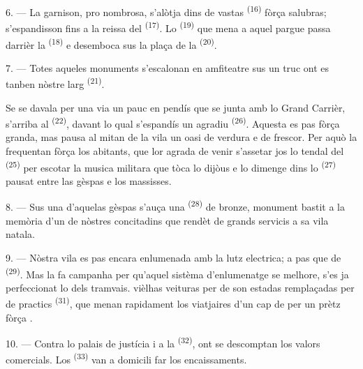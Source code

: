 \VUsaut{5.0mm}
\VUsaut{3.4mm}

6. --- La garnison, pro nombrosa, s'alòtja dins de vastas 
\textsuperscript{(16)} fòrça salubras; s'espandisson fins a la reissa del
 \textsuperscript{(17)}. Lo 
\textsuperscript{(19)} que mena a aquel pargue passa darrièr la  \textsuperscript{(18)} e desemboca sus la plaça de la
 \textsuperscript{(20)}.

7. --- Totes aqueles monuments s'escalonan en amfiteatre sus un truc ont es tanben
nòstre larg  \textsuperscript{(21)}.

Se se davala per una via un pauc en pendís que se junta amb lo Grand Carrièr,
s'arriba al  \textsuperscript{(22)}, davant lo qual
s'espandís un agradiu  \textsuperscript{(26)}. Aquesta
 es pas fòrça granda, mas pausa al mitan de la vila un
oasi de verdura e de frescor. Per aquò la frequentan fòrça los abitants, que lor
agrada de venir s'assetar jos lo tendal del  \textsuperscript{(25)}
per escotar la musica militara que tòca lo dijòus e lo dimenge dins lo
 \textsuperscript{(27)} pausat entre las gèspas e los massisses.

8. --- Sus una d'aquelas gèspas s'auça una 
\textsuperscript{(28)} de bronze, monument bastit a la memòria d'un de nòstres
concitadins que rendèt de grands servicis a sa vila natala.

\VUsaut{4.0mm}
\VUsaut{3.4mm}

9. --- Nòstra vila es pas encara enlumenada amb la lutz electrica; a pas que de
 \textsuperscript{(29)}. Mas la  fa
campanha per qu'aquel sistèma d'enlumenatge se melhore,  s'es ja
perfeccionat lo  dels tramvais.  vièlhas
veituras  per de  son estadas remplaçadas per de
practics  \textsuperscript{(31)}, que menan rapidament
los viatjaires d'un cap de  per un prètz fòrça
.

10. --- Contra lo palais de justícia i a la  \textsuperscript{(32)},
ont se descomptan los valors comercials. Los 
\textsuperscript{(33)} van a domicili far los encaissaments.

